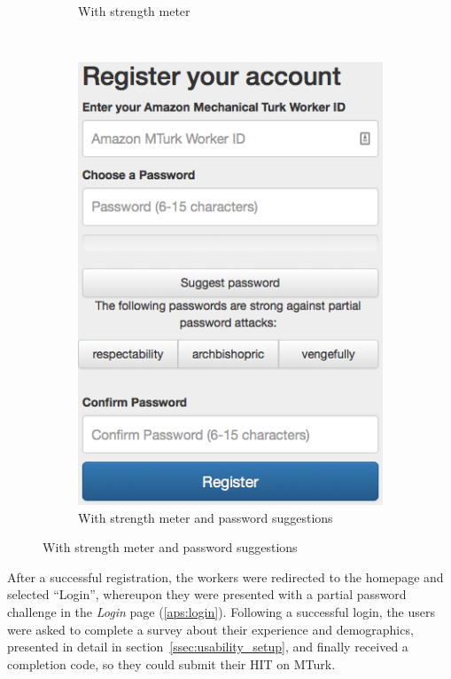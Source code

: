 \begin{figure}[H]
{\begin{subfigure}[t]{0.3\textwidth}
            \caption{With strength meter}
        \end{subfigure}
        ~
        \begin{subfigure}[t]{0.3\textwidth}
            \includegraphics[width=\textwidth]{Images/1-register-meter-sugg}
            \caption{With strength meter and password suggestions}
        \end{subfigure}
      }
    \end{figure}

    After a successful registration, the workers were redirected to the homepage and selected ``Login'', whereupon they were presented with a partial password challenge in the \emph{Login} page (\ref{aps:login}). Following a successful login, the users were asked to complete a survey about their experience and demographics, presented in detail in section~\ref{ssec:usability_setup}, and finally received a completion code, so they could submit their HIT on MTurk.

